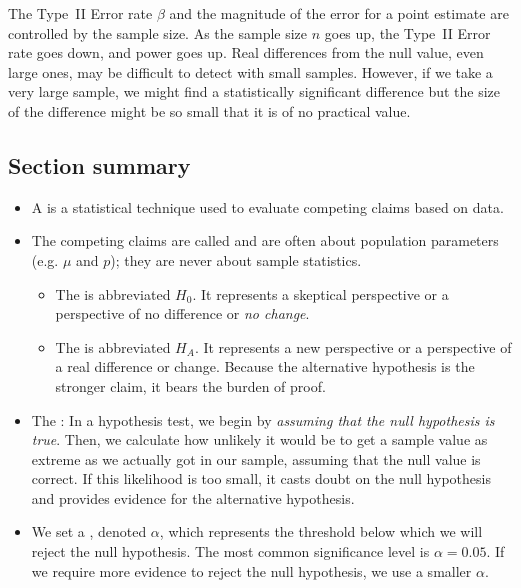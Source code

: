 The Type~II Error rate $\beta$ and the magnitude of the error for a point estimate are controlled by the sample size. As the sample size $n$ goes up, the Type~II Error rate goes down, and power goes up. Real differences from the null value, even large ones, may be difficult to detect with small samples. However, if we take a very large sample, we might find a statistically significant difference but the size of the difference might be so small that it is of no practical value.


\newpage
\subsection*{Section summary}


\begin{itemize}
\item A  is a statistical technique used to evaluate competing claims based on data.  

\item The competing claims are called  and are often about population parameters (e.g. $\mu$ and $p$); they are never about sample statistics.  \vspace{-1mm}
\begin{itemize}
\item The  is abbreviated $H_0$. It represents a skeptical perspective or a perspective of no difference or \emph{no change}.
\item The  is abbreviated $H_A$. It represents a new perspective or a perspective of a real difference or change.  Because the alternative hypothesis is the stronger claim, it bears the burden of proof.  
\end{itemize}

\item The :  In a hypothesis test, we begin by \textit{assuming that the null hypothesis is true}.  Then, we calculate how unlikely it would be to get a sample value as extreme as we actually got in our sample, assuming that the null value is correct.  If this likelihood is too small, it casts doubt on the null hypothesis and provides evidence for the alternative hypothesis.

\item We set a , denoted $\alpha$, which represents the threshold below which we will reject the null hypothesis.  The most common significance level is $\alpha = 0.05$.  If we require more evidence to reject the null hypothesis, we use a smaller $\alpha$.


\end{itemize}
